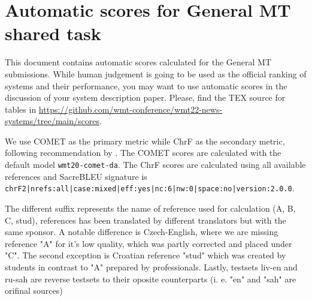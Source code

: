 \section{Automatic scores for General MT shared task}

This document contains automatic scores calculated for the General MT submissions. While human judgement is going to be used as the official ranking of systems and their performance, you may want to use automatic scores in the discussion of your system description paper. Please, find the TEX source for tables in \url{https://github.com/wmt-conference/wmt22-news-systems/tree/main/scores}.

We use COMET \cite{rei-etal-2020-comet} as the primary metric while ChrF \cite{popovic-2015-chrf} as the secondary metric, following recommendation by \citep{kocmi-etal-2021-ship}.
The COMET scores are calculated with the default model \texttt{wmt20-comet-da}.
The ChrF scores are calculated using all available references and SacreBLEU signature \cite{post-2018-call} is \texttt{chrF2|nrefs:all|case:mixed|eff:yes|nc:6|nw:0|space:no|version:2.0.0}.

The different suffix represents the name of reference used for calculation (A, B, C, stud), references has been translated by different translators but with the same sponsor. A notable difference is Czech-English, where we are missing reference "A" for it's low quality, which was partly corrected and placed under "C". The second exception is Croatian reference "stud" which was created by students in contrast to "A" prepared by professionals. Lastly, testsets liv-en and ru-sah are reverse testsets to their oposite counterparts (i. e. "en" and "sah" are orifinal sources)


